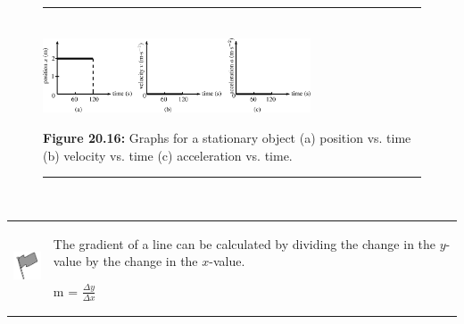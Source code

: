     \setcounter{subfigure}{0}


	\begin{figure}[H] %
    \begin{center}
    \rule[.1in]{\figurerulewidth}{.005in} \\
        \label{m38795*uid89!!!underscore!!!media}\label{m38795*uid89!!!underscore!!!printimage}\includegraphics[width=300px]{col11305.imgs/m38795_PG10C2_021.png} %
        
      \vspace{2pt}
    \vspace{\rubberspace}\par \begin{cnxcaption}
	  \small \textbf{Figure 20.16: }Graphs for a stationary object (a) position vs. time (b) velocity vs. time (c) acceleration vs. time.
	\end{cnxcaption}
      
    \vspace{.1in}
    \rule[.1in]{\figurerulewidth}{.005in} \\
        
    \end{center}

 \end{figure}   

    \addtocounter{footnote}{-0}
    
\par
            \label{m38795*fhsst!!!underscore!!!id1865}\begin{definition}
	  \begin{tabular*}{15 cm}{m{15 mm}m{}}
	\hspace*{-50pt}  \includegraphics[width=0.5in]{col11305.imgs/psflag2.png}   & \Definition{   \label{id2533985}\textbf{ Gradient }} { \label{m38795*meaningfhsst!!!underscore!!!id1865}
        \label{m38795*id69226}The gradient of a line can be calculated by dividing the change in the \begin{math}y\end{math}-value by the change in the \begin{math}x\end{math}-value.\par 
        \label{m38795*id69250}m = \begin{math}\frac{\Delta y}{\Delta x}\end{math} \par 
         } 
      \end{tabular*}
      \end{definition}

